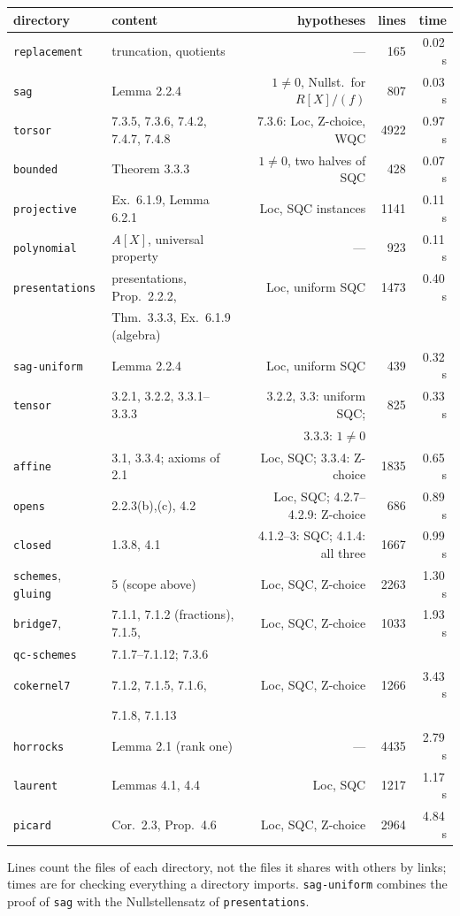 \documentclass[11pt]{article}
\newcommand{\kw}[1]{\texttt{#1}}
\theoremstyle{remark}
\begin{document}
\begin{center}\small
\begin{tabular}{llrrr}
directory & content & hypotheses & lines & time\\\hline
\kw{replacement} & truncation, quotients & --- & 165 & 0.02\,s\\
\kw{sag} & Lemma 2.2.4 & $1\ne0$, Nullst.\ for $R[X]/(f)$ & 807 & 0.03\,s\\
\kw{torsor} & 7.3.5, 7.3.6, 7.4.2, 7.4.7, 7.4.8 & 7.3.6: Loc, Z-choice, WQC & 4922 & 0.97\,s\\
\kw{bounded} & Theorem 3.3.3 & $1\ne0$, two halves of SQC & 428 & 0.07\,s\\
\kw{projective} & Ex.~6.1.9, Lemma 6.2.1 & Loc, SQC instances & 1141 & 0.11\,s\\
\kw{polynomial} & $A[X]$, universal property & --- & 923 & 0.11\,s\\
\kw{presentations} & presentations, Prop.~2.2.2, & Loc, uniform SQC & 1473 & 0.40\,s\\
 & Thm.~3.3.3, Ex.~6.1.9 (algebra) & & & \\
\kw{sag-uniform} & Lemma 2.2.4 & Loc, uniform SQC & 439 & 0.32\,s\\
\kw{tensor} & 3.2.1, 3.2.2, 3.3.1--3.3.3 & 3.2.2, 3.3: uniform SQC; & 825 & 0.33\,s\\
 & & 3.3.3: $1\ne0$ & & \\
\kw{affine} & 3.1, 3.3.4; axioms of 2.1 & Loc, SQC; 3.3.4: Z-choice & 1835 & 0.65\,s\\
\kw{opens} & 2.2.3(b),(c), 4.2 & Loc, SQC; 4.2.7--4.2.9: Z-choice & 686 & 0.89\,s\\
\kw{closed} & 1.3.8, 4.1 & 4.1.2--3: SQC; 4.1.4: all three & 1667 & 0.99\,s\\
\kw{schemes}, \kw{gluing} & 5 (scope above) & Loc, SQC, Z-choice & 2263 & 1.30\,s\\
\kw{bridge7}, & 7.1.1, 7.1.2 (fractions), 7.1.5, & Loc, SQC, Z-choice & 1033 & 1.93\,s\\
\kw{qc-schemes} & 7.1.7--7.1.12; 7.3.6 & & & \\
\kw{cokernel7} & 7.1.2, 7.1.5, 7.1.6, & Loc, SQC, Z-choice & 1266 & 3.43\,s\\
 & 7.1.8, 7.1.13 & & & \\
\kw{horrocks} & \cite{Proj} Lemma 2.1 (rank one) & --- & 4435 & 2.79\,s\\
\kw{laurent} & \cite{Proj} Lemmas 4.1, 4.4 & Loc, SQC & 1217 & 1.17\,s\\
\kw{picard} & \cite{Proj} Cor.~2.3, Prop.~4.6 & Loc, SQC, Z-choice & 2964 & 4.84\,s\\
\end{tabular}
\end{center}
Lines count the files of each directory, not the files it shares with
others by links; times are for checking everything a directory imports.
\kw{sag-uniform} combines the proof of \kw{sag} with the
Nullstellensatz of \kw{presentations}.
\end{document}
